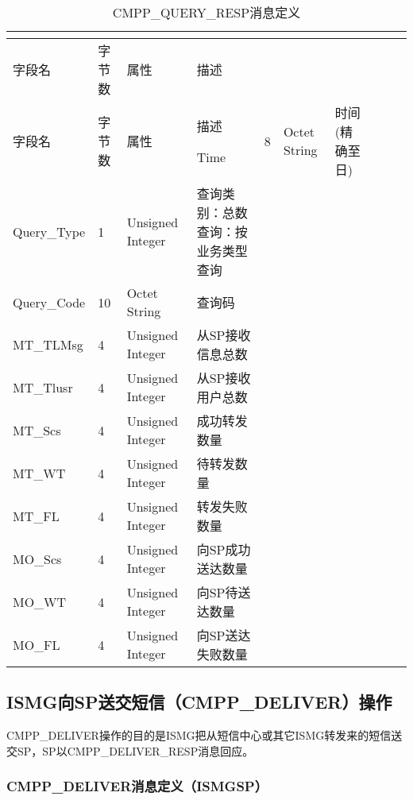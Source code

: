 \documentclass[11pt]{book} %
\begin{document}
\begin{longtable}{|m{90pt}|m{35pt}|m{80pt}|m{200pt}|}
\tabularnewline\hline
字段名&字节数&属性&描述
\endhead

\caption{CMPP\_QUERY\_RESP消息定义}\\
\hline
字段名&字节数&属性&描述
\endfirsthead

\endfoot

\endlastfoot

\hline
Time&8&Octet String&时间(精确至日)\\
\hline
Query\_Type&1&Unsigned Integer&查询类别：总数查询：按业务类型查询\\
\hline
Query\_Code&10&Octet String&查询码\\
\hline
MT\_TLMsg&4&Unsigned Integer&从SP接收信息总数\\
\hline
MT\_Tlusr&4&Unsigned Integer&从SP接收用户总数\\
\hline
MT\_Scs&4&Unsigned Integer&成功转发数量\\
\hline
MT\_WT&4&Unsigned Integer&待转发数量\\
\hline
MT\_FL&4&Unsigned Integer&转发失败数量\\
\hline
MO\_Scs&4&Unsigned Integer&向SP成功送达数量\\
\hline
MO\_WT&4&Unsigned Integer&向SP待送达数量\\
\hline
MO\_FL&4&Unsigned Integer&向SP送达失败数量\\
\hline
\end{longtable}


\subsection{ISMG向SP送交短信（CMPP\_DELIVER）操作}

CMPP\_DELIVER操作的目的是ISMG把从短信中心或其它ISMG转发来的短信送交SP，SP以CMPP\_DELIVER\_RESP消息回应。



\subsubsection{CMPP\_DELIVER消息定义（ISMG\textrightarrow SP）}
\end{document}
